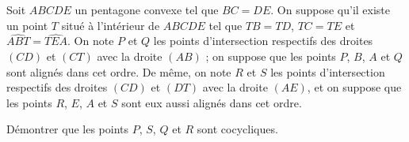 Soit $ABCDE$ un pentagone convexe tel que $BC = DE$. On suppose qu'il existe un point $T$ situé à
l'intérieur de $ABCDE$ tel que $TB = TD$, $TC = TE$ et $\widehat{ABT} = \widehat{TEA}$. On note $P$ et $Q$ les
points d'intersection respectifs des droites $(CD)$ et $(CT)$ avec la droite $(AB)$ ; on suppose que les
points $P$, $B$, $A$ et $Q$ sont alignés dans cet ordre. De même, on note $R$ et $S$ les points
d'intersection respectifs des droites $(CD)$ et $(DT)$ avec la droite $(AE)$, et on suppose que les points
$R$, $E$, $A$ et $S$ sont eux aussi alignés dans cet ordre.

Démontrer que les points $P$, $S$, $Q$ et $R$ sont cocycliques.
